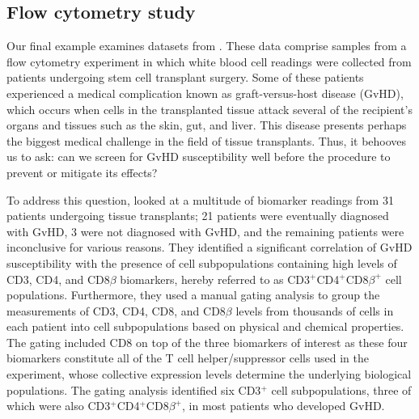 \documentclass{uwstat572}
\renewcommand\;{\,}
\begin{document}
\subsection{Flow cytometry study}\label{GvHD}
Our final example examines datasets from \cite{Brinkman07}.
These data comprise samples from a flow cytometry experiment in which white blood cell readings were collected from patients undergoing stem cell transplant surgery.
Some of these patients experienced a medical complication known as graft-versus-host disease (GvHD), which occurs when cells in the transplanted tissue attack several of the recipient's organs and tissues such as the skin, gut, and liver.
This disease presents perhaps the biggest medical challenge in the field of tissue transplants.
Thus, it behooves us to ask: can we screen for GvHD susceptibility well before the procedure to prevent or mitigate its effects?

To address this question, \cite{Brinkman07} looked at a multitude of biomarker readings from 31 patients undergoing tissue transplants; 21 patients were eventually diagnosed with GvHD, 3 were not diagnosed with GvHD, and the remaining patients were inconclusive for various reasons.
They identified a significant correlation of GvHD susceptibility with the presence of cell subpopulations containing high levels of CD3, CD4, and CD8$\beta$ biomarkers, hereby referred to as CD3$^+$CD4$^+$CD8$\beta^+$ cell populations.
Furthermore, they used a manual gating analysis to group the measurements of CD3, CD4, CD8, and CD8$\beta$ levels from thousands of cells in each patient into cell subpopulations based on physical and chemical properties.
The gating included CD8 on top of the three biomarkers of interest as these four biomarkers constitute all of the T cell helper/suppressor cells used in the experiment, whose collective expression levels determine the underlying biological populations.
The gating analysis identified six CD3$^+$ cell subpopulations, three of which were also 
CD3$^+$CD4$^+$CD8$\beta^+$, in most patients who developed GvHD.
\end{document}
